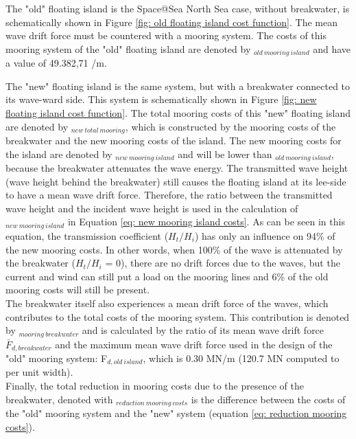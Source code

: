 The "old" floating island is the Space@Sea North Sea case, without breakwater, is schematically shown in Figure \ref{fig: old floating island cost function}. The mean wave drift force must be countered with a mooring system. The costs of this mooring system of the "old" floating island are denoted by \texteuro$_{old~mooring~island}$ and have a value of 49.382,71 \texteuro/m. 


The "new" floating island is the same system, but with a breakwater connected to its wave-ward side. This system is schematically shown in Figure \ref{fig: new floating island cost function}. The total mooring costs of this "new" floating island are denoted by \texteuro$_{new~total~mooring}$, which is constructed by the mooring costs of the breakwater and the new mooring costs of the island. The new mooring costs for the island are denoted by \texteuro$_{new~mooring~island}$ and will be lower than \texteuro$_{old~mooring~island}$, because the breakwater attenuates the wave energy. The transmitted wave height (wave height behind the breakwater) still causes the floating island at its lee-side to have a mean wave drift force. Therefore, the ratio between the transmitted wave height and the incident wave height is used in the calculation of \texteuro$_{new~mooring~island}$ in Equation \ref{eq: new mooring island costs}.  As can be seen in this equation, the transmission coefficient ($H_t/H_i$) has only an influence on 94\% of the new mooring costs. In other words, when 100\% of the wave is attenuated by the breakwater ($H_t/H_i$ = 0), there are no drift forces due to the waves, but the current and wind can still put a load on the mooring lines and 6\% of the old mooring costs will still be present.\\
The breakwater itself also experiences a mean drift force of the waves, which contributes to the total costs of the mooring system. This contribution is denoted by \texteuro$_{mooring~breakwater}$ and is calculated by the ratio of its mean wave drift force $\bar{F}_{d, breakwater}$ and the maximum mean wave drift force used in the design of the "old" mooring system: F$_{d, old~island}$, which is 0.30 MN/m (120.7 MN computed to per unit width). \\
Finally, the total reduction in mooring costs due to the presence of the breakwater, denoted with \texteuro$_{reduction~mooring~costs} $ is the difference between the costs of the "old" mooring system and the "new" system (equation \ref{eq: reduction mooring costs}).



